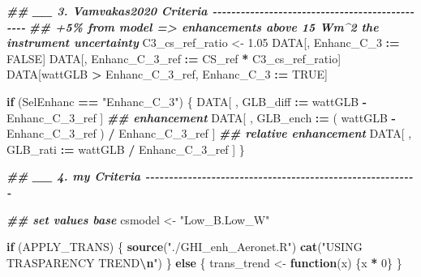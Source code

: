 \documentclass[
  10pt,
  a4paper,oneside]{article}
\newenvironment{Shaded}{\begin{snugshade}}{\end{snugshade}}
\newcommand{\ConstantTok}[1]{\textcolor[rgb]{0.56,0.35,0.01}{#1}}
\newcommand{\ControlFlowTok}[1]{\textcolor[rgb]{0.13,0.29,0.53}{\textbf{#1}}}
\newcommand{\DecValTok}[1]{\textcolor[rgb]{0.00,0.00,0.81}{#1}}
\newcommand{\DocumentationTok}[1]{\textcolor[rgb]{0.56,0.35,0.01}{\textbf{\textit{#1}}}}
\newcommand{\FloatTok}[1]{\textcolor[rgb]{0.00,0.00,0.81}{#1}}
\newcommand{\FunctionTok}[1]{\textcolor[rgb]{0.13,0.29,0.53}{\textbf{#1}}}
\newcommand{\NormalTok}[1]{#1}
\newcommand{\OtherTok}[1]{\textcolor[rgb]{0.56,0.35,0.01}{#1}}
\newcommand{\SpecialCharTok}[1]{\textcolor[rgb]{0.81,0.36,0.00}{\textbf{#1}}}
\newcommand{\StringTok}[1]{\textcolor[rgb]{0.31,0.60,0.02}{#1}}
\begin{document}
\begin{Shaded}
\begin{Highlighting}[]
\DocumentationTok{\#\# \_\_ 3. Vamvakas2020  Criteria  {-}{-}{-}{-}{-}{-}{-}{-}{-}{-}{-}{-}{-}{-}{-}{-}{-}{-}{-}{-}{-}{-}{-}{-}{-}{-}{-}{-}{-}{-}{-}{-}{-}{-}{-}{-}{-}{-}{-}{-}{-}{-}{-}{-}{-}{-}{-}}
\DocumentationTok{\#\# +5\% from model =\textgreater{} enhancements above 15 Wm\^{}2 the instrument uncertainty}
\NormalTok{C3\_cs\_ref\_ratio }\OtherTok{\textless{}{-}} \FloatTok{1.05}
\NormalTok{DATA[, Enhanc\_C\_3 }\SpecialCharTok{:=} \ConstantTok{FALSE}\NormalTok{]}
\NormalTok{DATA[, Enhanc\_C\_3\_ref }\SpecialCharTok{:=}\NormalTok{ CS\_ref }\SpecialCharTok{*}\NormalTok{ C3\_cs\_ref\_ratio]}
\NormalTok{DATA[wattGLB }\SpecialCharTok{\textgreater{}}\NormalTok{ Enhanc\_C\_3\_ref,}
\NormalTok{     Enhanc\_C\_3 }\SpecialCharTok{:=} \ConstantTok{TRUE}\NormalTok{]}

\ControlFlowTok{if}\NormalTok{ (SelEnhanc }\SpecialCharTok{==} \StringTok{"Enhanc\_C\_3"}\NormalTok{) \{}
\NormalTok{  DATA[ , GLB\_diff }\SpecialCharTok{:=}\NormalTok{   wattGLB }\SpecialCharTok{{-}}\NormalTok{ Enhanc\_C\_3\_ref                    ] }\DocumentationTok{\#\# enhancement}
\NormalTok{  DATA[ , GLB\_ench }\SpecialCharTok{:=}\NormalTok{ ( wattGLB }\SpecialCharTok{{-}}\NormalTok{ Enhanc\_C\_3\_ref ) }\SpecialCharTok{/}\NormalTok{ Enhanc\_C\_3\_ref ] }\DocumentationTok{\#\# relative enhancement}
\NormalTok{  DATA[ , GLB\_rati }\SpecialCharTok{:=}\NormalTok{   wattGLB }\SpecialCharTok{/}\NormalTok{ Enhanc\_C\_3\_ref                    ]}
\NormalTok{\}}



\DocumentationTok{\#\# \_\_ 4. my Criteria  {-}{-}{-}{-}{-}{-}{-}{-}{-}{-}{-}{-}{-}{-}{-}{-}{-}{-}{-}{-}{-}{-}{-}{-}{-}{-}{-}{-}{-}{-}{-}{-}{-}{-}{-}{-}{-}{-}{-}{-}{-}{-}{-}{-}{-}{-}{-}{-}{-}{-}{-}{-}{-}{-}{-}{-}{-}{-}}

\DocumentationTok{\#\# set values base}
\NormalTok{csmodel }\OtherTok{\textless{}{-}} \StringTok{"Low\_B.Low\_W"}



\ControlFlowTok{if}\NormalTok{ (APPLY\_TRANS) \{}
  \FunctionTok{source}\NormalTok{(}\StringTok{"./GHI\_enh\_Aeronet.R"}\NormalTok{)}
  \FunctionTok{cat}\NormalTok{(}\StringTok{"USING TRASPARENCY TREND}\SpecialCharTok{\textbackslash{}n}\StringTok{"}\NormalTok{)}
\NormalTok{\} }\ControlFlowTok{else}\NormalTok{ \{}
\NormalTok{  trans\_trend }\OtherTok{\textless{}{-}} \ControlFlowTok{function}\NormalTok{(x) \{x }\SpecialCharTok{*} \DecValTok{0}\NormalTok{\}}
\NormalTok{\}}
\end{Highlighting}
\end{Shaded}
\end{document}
